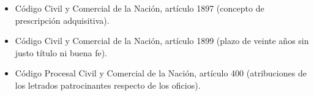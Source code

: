 \documentclass[12pt,oneside]{book}
\begin{document}
\begin{itemize}
    \item Código Civil y Comercial de la Nación, artículo 1897 (concepto de prescripción adquisitiva).
    \item Código Civil y Comercial de la Nación, artículo 1899 (plazo de veinte años sin justo título ni buena fe).
    \item Código Procesal Civil y Comercial de la Nación, artículo 400 (atribuciones de los letrados patrocinantes respecto de los oficios).
\end{itemize}
\end{document}
